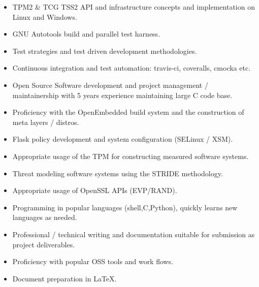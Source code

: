 \documentclass[letterpaper,11pt]{article}
\begin{document}
    \begin {itemize}
      \setlength {\itemsep}{1pt}
      \setlength {\parskip}{0pt}
      \setlength {\parsep}{0pt}
      \item TPM2 \& TCG TSS2 API and infrastructure concepts and implementation
          on Linux and Windows.
      \item GNU Autotools build and parallel test harness.
      \item Test strategies and test driven development methodologies.
      \item Continuous integration and test automation: travis-ci, coveralls,
        cmocka etc.
      \item Open Source Software development and project management /
        maintainership with 5 years experience maintaining large C code
        base.
      \item Proficiency with the OpenEmbedded build system and the construction of meta layers / distros.
      \item Flask policy development and system configuration (SELinux / XSM).
      \item Appropriate usage of the TPM for constructing measured software systems.
      \item Threat modeling software systems using the STRIDE methodology.
      \item Appropriate usage of OpenSSL APIs (EVP/RAND).
      \item Programming in popular languages (shell,C,Python), quickly learns new languages as needed.
      \item Professional / technical writing and documentation suitable for submission as project deliverables.
      \item Proficiency with popular OSS tools and work flows.
      \item Document preparation in \LaTeX.
    \end {itemize}
\end{document}
